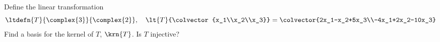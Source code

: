 Define the linear transformation
%
\begin{equation*}
\ltdefn{T}{\complex{3}}{\complex{2}},\quad
\lt{T}{\colvector{x_1\\x_2\\x_3}}=\colvector{2x_1-x_2+5x_3\\-4x_1+2x_2-10x_3}
\end{equation*}
%
Find a basis for the kernel of $T$, $\krn{T}$.  Is $T$ injective?